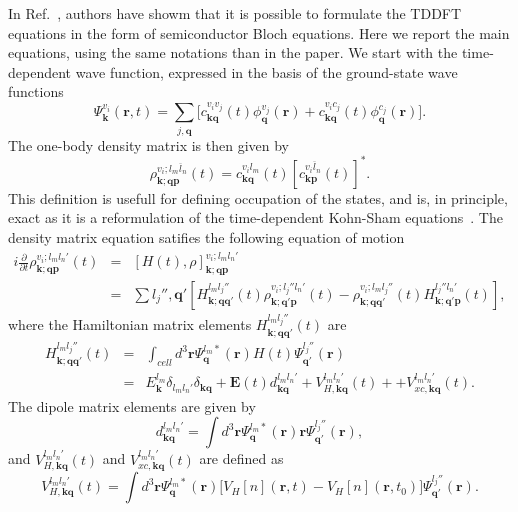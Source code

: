 \documentclass[a4paper,11pt]{report}
\renewcommand{\vec}[1]{\mathbf{#1}}
\begin{document}
In Ref.~\cite{PhysRevB.77.075204}, authors have showm that it is possible to formulate the TDDFT equations in the form of semiconductor Bloch equations.
Here we report the main equations, using the same notations than in the paper. 
We start with the time-dependent wave function, expressed in the basis of the ground-state wave functions
\begin{equation}
 \Psi^{v_i}_{\vec{k}}(\vec{r},t) = \sum_{j, \vec{q}}\Big[ c^{v_iv_j}_{\vec{kq}}(t)\phi^{v_j}_{\vec{q}}(\vec{r}) + c^{v_ic_j}_{\vec{kq}}(t)\phi^{c_j}_{\vec{q}}(\vec{r})\Big].\nonumber
\end{equation}
The one-body density matrix is then given by~\cite{PhysRevB.77.075204}
\begin{equation}
 \rho_{\vec{k};\vec{qp}}^{v_i;l_m\overline{l}_n}(t) = c^{v_il_m}_{\vec{kq}}(t)[c^{v_i\overline{l}_n}_{\vec{kp}}(t)]^*.
\end{equation}
This definition is usefull for defining occupation of the states, and is, in principle, exact as it is a reformulation of the time-dependent Kohn-Sham equations~\cite{PhysRevB.77.075204}.
The density matrix equation satifies the following equation of motion~\cite{PhysRevB.77.075204}
\begin{eqnarray}
 i\frac{\partial}{\partial t}\rho_{\vec{k};\vec{qp}}^{v_i;l_ml_n'}(t) &=& \left[ H(t),\rho\right]_{\vec{k};\vec{qp}}^{v_i;l_ml_n'} \nonumber\\
  &=& \sum{l_j'',\vec{q'}} \left[ H_{\vec{k};\vec{qq'}}^{l_ml_j''}(t) \rho_{\vec{k};\vec{q'p}}^{v_i;l_j''l_n'}(t) - \rho_{\vec{k};\vec{qq'}}^{v_i;l_ml_j''}(t)H_{\vec{k};\vec{q'p}}^{l_j''l_n'}(t)   \right],
\end{eqnarray}
where the Hamiltonian matrix elements $ H_{\vec{k};\vec{qq'}}^{l_ml_j''}(t)$ are
\begin{eqnarray}
  H_{\vec{k};\vec{qq'}}^{l_ml_j''}(t) &=& \int_{cell} d^3\vec{r} \Psi^{l_m*}_{\vec{q}}(\vec{r}) H(t)\Psi^{l_j''}_{\vec{q'}}(\vec{r}) \nonumber\\
   &=& E_{\vec{k}}^{l_m}\delta_{l_ml_n'}\delta_{\vec{kq}} + \vec{E}(t)d^{l_ml_n'}_{\vec{kq}} + V_{H,\vec{kq}}^{l_ml_n'}(t) +  + V_{xc,\vec{kq}}^{l_ml_n'}(t).
\end{eqnarray}
The dipole matrix elements are given by
\begin{equation}
 d^{l_ml_n'}_{\vec{kq}} = \int d^3\vec{r} \Psi^{l_m*}_{\vec{q}}(\vec{r})\vec{r}\Psi^{l_j''}_{\vec{q'}}(\vec{r}),
\end{equation}
and $V_{H,\vec{kq}}^{l_ml_n'}(t)$ and $V_{xc,\vec{kq}}^{l_ml_n'}(t)$ are defined as
\begin{equation}
  V_{H,\vec{kq}}^{l_ml_n'}(t) = \int d^3\vec{r} \Psi^{l_m*}_{\vec{q}}(\vec{r})\Big[V_{H}[n](\vec{r},t) - V_{H}[n](\vec{r},t_0) \Big] \Psi^{l_j''}_{\vec{q'}}(\vec{r}).
\end{equation}
\end{document}
